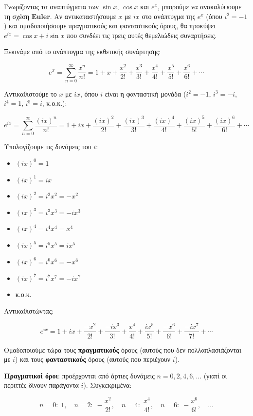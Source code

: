 \documentclass[a4paper, 11pt]{article}
\providecommand{\tightlist}{\setlength{\itemsep}{0pt}\setlength{\parskip}{0pt}}
\begin{document}
Γνωρίζοντας τα αναπτύγματα των \(\sin x\), \(\cos x\) και \(e^x\),
μπορούμε να ανακαλύψουμε τη σχέση \textbf{Euler}. Αν αντικαταστήσουμε
\(x\) με \(ix\) στο ανάπτυγμα της \(e^x\) (όπου \(i^2=-1\)) και
ομαδοποιήσουμε πραγματικούς και φανταστικούς όρους, θα προκύψει
\(e^{ix} = \cos x + i\sin x\) που συνδέει τις τρεις αυτές θεμελιώδεις
συναρτήσεις.

Ξεκινάμε από το ανάπτυγμα της εκθετικής συνάρτησης:

\[
e^{x} = \sum_{n=0}^{\infty} \frac{x^n}{n!} = 1 + x + \frac{x^2}{2!} + \frac{x^3}{3!} + \frac{x^4}{4!} + \frac{x^5}{5!} + \frac{x^6}{6!} + \cdots
\]

Αντικαθιστούμε το \(x\) με \(ix\), όπου \(i\) είναι η φανταστική μονάδα
(\(i^2 = -1\), \(i^3 = -i\), \(i^4 = 1\), \(i^5 = i\), κ.ο.κ.):

\[
e^{ix} = \sum_{n=0}^{\infty} \frac{(ix)^n}{n!} = 1 + ix + \frac{(ix)^2}{2!} + \frac{(ix)^3}{3!} + \frac{(ix)^4}{4!} + \frac{(ix)^5}{5!} + \frac{(ix)^6}{6!} + \cdots
\]

Υπολογίζουμε τις δυνάμεις του \(i\):

\begin{itemize}
\tightlist
\item
  \((ix)^0 = 1\)
\item
  \((ix)^1 = i x\)
\item
  \((ix)^2 = i^2 x^2 = -x^2\)
\item
  \((ix)^3 = i^3 x^3 = -i x^3\)
\item
  \((ix)^4 = i^4 x^4 = x^4\)
\item
  \((ix)^5 = i^5 x^5 = i x^5\)
\item
  \((ix)^6 = i^6 x^6 = -x^6\)
\item
  \((ix)^7 = i^7 x^7 = -i x^7\)
\item
  κ.ο.κ.
\end{itemize}

Αντικαθιστώντας:

\[
e^{ix} = 1 + ix + \frac{-x^2}{2!} + \frac{-i x^3}{3!} + \frac{x^4}{4!} + \frac{i x^5}{5!} + \frac{-x^6}{6!} + \frac{-i x^7}{7!} + \cdots
\]

Ομαδοποιούμε τώρα τους \textbf{πραγματικούς} όρους (αυτούς που δεν
πολλαπλασιάζονται με \(i\)) και τους \textbf{φανταστικούς} όρους (αυτούς
που περιέχουν \(i\)).

\textbf{Πραγματικοί όροι}: προέρχονται από άρτιες δυνάμεις
\(n = 0,2,4,6,\dots\) (γιατί οι περιττές δίνουν παράγοντα \(i\)).
Συγκεκριμένα:

\[
n=0:\; 1,\quad n=2:\; -\frac{x^2}{2!},\quad n=4:\; \frac{x^4}{4!},\quad n=6:\; -\frac{x^6}{6!},\quad \dots
\]
\end{document}
